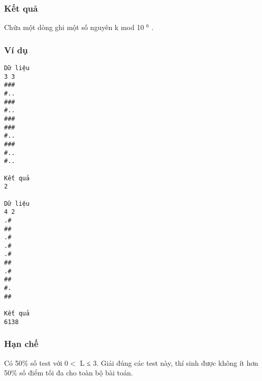 \subsubsection{   Kết quả  }

   Chứa một dòng ghi một số nguyên k mod 10   $^    6   $   .  

\subsubsection{   Ví dụ  }
\begin{verbatim}
Dữ liệu
3 3
###
#..
###
#..
###
###
#..
###
#..
#..	

Kết quả
2

Dữ liệu
4 2
.#
##
.#
.#
.#
##
.#
##
#.
##	

Kết quả
6138
\end{verbatim}

\subsubsection{   Hạn chế  }

   Có 50\% số test với 0$<$ L ≤ 3. Giải đúng các test này, thí sinh được không ít hơn 50\% số điểm tối đa cho toàn bộ bài toán.  